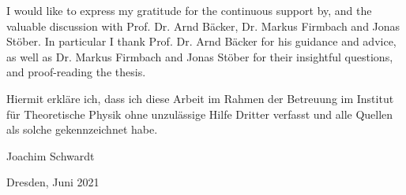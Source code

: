 \clearpage
\thispagestyle{empty}
\vspace*{1.5em}


I would like to express my gratitude for the continuous support by, and the valuable discussion with Prof. Dr. Arnd Bäcker, Dr. Markus Firmbach and Jonas Stöber.
In particular I thank Prof. Dr. Arnd Bäcker for his guidance and advice, as well as Dr. Markus Firmbach and Jonas Stöber for their insightful questions, and proof-reading the thesis.


\clearpage
\thispagestyle{empty}
\vspace*{1.5em}

Hiermit erkläre ich, dass ich diese Arbeit im Rahmen der Betreuung im Institut
für Theoretische Physik ohne unzulässige Hilfe Dritter verfasst und alle
Quellen als solche gekennzeichnet habe.

\vspace*{45em}

Joachim Schwardt \par
Dresden, Juni 2021